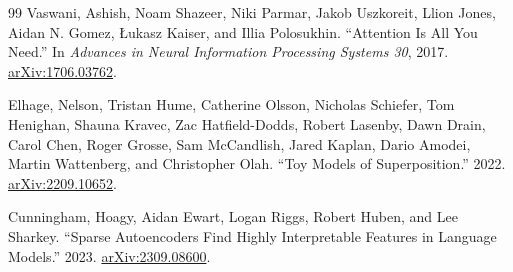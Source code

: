 \documentclass[11pt,a4paper]{article}
\begin{document}
\begin{thebibliography}{99}
Vaswani, Ashish, Noam Shazeer, Niki Parmar, Jakob Uszkoreit, Llion Jones, Aidan N. Gomez, \L ukasz Kaiser, and Illia Polosukhin. ``Attention Is All You Need.'' In \textit{Advances in Neural Information Processing Systems 30}, 2017. \href{https://arxiv.org/abs/1706.03762}{arXiv:1706.03762}.

Elhage, Nelson, Tristan Hume, Catherine Olsson, Nicholas Schiefer, Tom Henighan, Shauna Kravec, Zac Hatfield-Dodds, Robert Lasenby, Dawn Drain, Carol Chen, Roger Grosse, Sam McCandlish, Jared Kaplan, Dario Amodei, Martin Wattenberg, and Christopher Olah. ``Toy Models of Superposition.'' 2022. \href{https://arxiv.org/abs/2209.10652}{arXiv:2209.10652}.

Cunningham, Hoagy, Aidan Ewart, Logan Riggs, Robert Huben, and Lee Sharkey. ``Sparse Autoencoders Find Highly Interpretable Features in Language Models.'' 2023. \href{https://arxiv.org/abs/2309.08600}{arXiv:2309.08600}.
\end{thebibliography}
\end{document}
